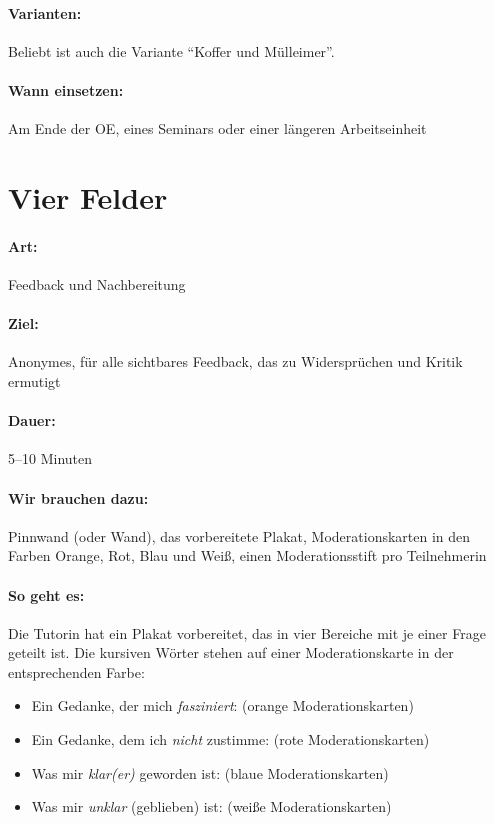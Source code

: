 \paragraph{Varianten:} Beliebt ist auch die Variante "`Koffer und Mülleimer"'.
\paragraph{Wann einsetzen:} Am Ende der OE, eines Seminars oder einer längeren Arbeitseinheit

\section{Vier Felder}
\paragraph{Art:} Feedback und Nachbereitung
\paragraph{Ziel:} Anonymes, für alle sichtbares Feedback, das zu Widersprüchen und Kritik ermutigt
\paragraph{Dauer:} 5--10 Minuten
\paragraph{Wir brauchen dazu:} Pinnwand (oder Wand), das vorbereitete Plakat, Moderationskarten in den Farben Orange, Rot, Blau und Weiß, einen Moderationsstift pro Teilnehmerin
\paragraph{So geht es:} Die Tutorin hat ein Plakat vorbereitet, das in vier Bereiche mit je einer Frage geteilt ist. Die kursiven Wörter stehen auf einer Moderationskarte in der entsprechenden Farbe:
\begin{itemize}
\item Ein Gedanke, der mich \emph{fasziniert}: (orange Moderationskarten)
\item Ein Gedanke, dem ich \emph{nicht} zustimme: (rote Moderationskarten)
\item Was mir \emph{klar(er)} geworden ist: (blaue Moderationskarten)
\item Was mir \emph{unklar} (geblieben) ist: (weiße Moderationskarten)
\end{itemize}

